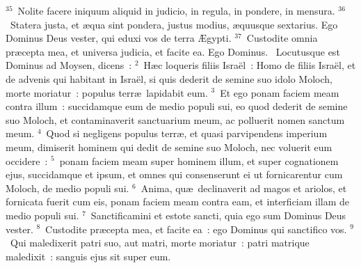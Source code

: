 ${}^{35}$~Nolite facere iniquum aliquid in judicio, in regula, in pondere, in mensura.
${}^{36}$~Statera justa, et \ae qua sint pondera, justus modius, \ae quusque sextarius. Ego Dominus Deus vester, qui eduxi vos de terra \AE gypti.
${}^{37}$~Custodite omnia pr\ae cepta mea, et universa judicia, et facite ea. Ego Dominus.
~Locutusque est Dominus ad Moysen, dicens~:
${}^{2}$~H\ae c loqueris filiis Isra\"el~: Homo de filiis Isra\"el, et de advenis qui habitant in Isra\"el, si quis dederit de semine suo idolo Moloch, morte moriatur~: populus terr\ae\ lapidabit eum.
${}^{3}$~Et ego ponam faciem meam contra illum~: succidamque eum de medio populi sui, eo quod dederit de semine suo Moloch, et contaminaverit sanctuarium meum, ac polluerit nomen sanctum meum.
${}^{4}$~Quod si negligens populus terr\ae , et quasi parvipendens imperium meum, dimiserit hominem qui dedit de semine suo Moloch, nec voluerit eum occidere~:
${}^{5}$~ponam faciem meam super hominem illum, et super cognationem ejus, succidamque et ipsum, et omnes qui consenserunt ei ut fornicarentur cum Moloch, de medio populi sui.
${}^{6}$~Anima, qu\ae\ declinaverit ad magos et ariolos, et fornicata fuerit cum eis, ponam faciem meam contra eam, et interficiam illam de medio populi sui.
${}^{7}$~Sanctificamini et estote sancti, quia ego sum Dominus Deus vester.
${}^{8}$~Custodite pr\ae cepta mea, et facite ea~: ego Dominus qui sanctifico vos.
${}^{9}$~Qui maledixerit patri suo, aut matri, morte moriatur~: patri matrique maledixit~: sanguis ejus sit super eum.


